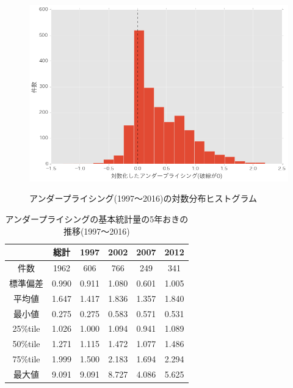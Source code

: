 \documentclass{jsarticle}
\begin{document}
\begin{figure}[!h]
  \begin{center}
  \caption{アンダープライシング(1997〜2016)の対数分布ヒストグラム}
    \includegraphics[clip,width=14cm]{./loghist.png}
    \label{loghist}
  \end{center}
\end{figure}

\newpage



\begin{table}[t]
  \begin{center}
  \caption{アンダープライシングの基本統計量の5年おきの推移(1997〜2016)}
\begin{tabular*}{120mm}{@{\extracolsep{\fill}}c|ccccc}

\hline
\  & 総計 &  1997 &  2002&   2007  & 2012 \\
\hline \hline
件数 &1962 & 606 & 766 & 249 & 341 \\
\hline
標準偏差&       0.990  &0.911  &1.080 & 0.601 & 1.005 \\
\hline
平均値   &  1.647 & 1.417 & 1.836 & 1.357 & 1.840 \\
\hline
最小値    &     0.275 & 0.275 & 0.583 & 0.571&  0.531 \\
25\%tile   &       1.026 & 1.000  &1.094 & 0.941 & 1.089 \\
50\%tile    &      1.271&  1.115 & 1.472 & 1.077  &1.486 \\
75\%tile     &     1.999 & 1.500 & 2.183  &1.694 & 2.294 \\
最大値  &   9.091 & 9.091&  8.727 & 4.086 & 5.625 \\
\hline
	\end{tabular*}
	\label{stats} 
  \end{center}
\end{table}
\end{document}
